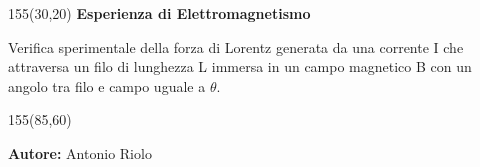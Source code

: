 \begin{center}



\vspace*{10cm}

\setlength{\TPHorizModule}{1mm}
\setlength{\TPVertModule}{\TPHorizModule}

\newlength{\backupparindent}
\setlength{\backupparindent}{\parindent}
\setlength{\parindent}{0mm}

\begin{textblock}{155}(30,20)
    \vspace*{1mm}
    \huge
    \textbf{Esperienza di Elettromagnetismo\\}
    \LARGE
    \vspace*{5mm}
    \begin{flushleft}
    {Verifica sperimentale della forza di Lorentz generata da una corrente I che attraversa un filo di lunghezza L immersa in un campo magnetico B con un angolo tra filo e campo uguale a $\theta$.}
    \\
    \end{flushleft}
    \textbf{}
    \par
    \vspace*{15mm}
    \Large
    \begin{textblock}{155}(85,60)
    \begin{flushleft}
        \Large
           
            
             \textbf{Autore:} Antonio Riolo
            
            
            


    \end{flushleft}
    \end{textblock}
\end{textblock}




\setlength{\parindent}{\backupparindent}
\end{center}

